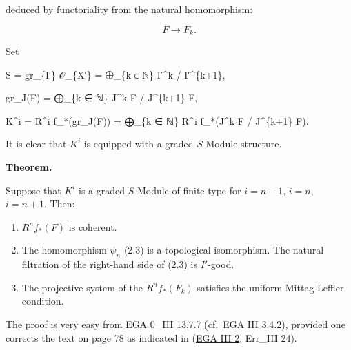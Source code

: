 \documentclass[
  11pt,
  a4paper,
]{book}
\newenvironment{Shaded}{}{}
\newcommand{\NormalTok}[1]{#1}
\begin{document}
deduced by functoriality from the natural homomorphism:

\[ F \to F_{k}. \]

Set

\begin{Shaded}
\begin{Highlighting}[]
\NormalTok{S = gr\_\{I′\} 𝒪\_\{X′\} = ⨁\_\{k ∈ ℕ\} I′\^{}k / I′\^{}\{k+1\},}
\end{Highlighting}
\end{Shaded}

\begin{Shaded}
\begin{Highlighting}[]
\NormalTok{gr\_J(F) = ⨁\_\{k ∈ ℕ\} J\^{}k F / J\^{}\{k+1\} F,}
\end{Highlighting}
\end{Shaded}

\begin{Shaded}
\begin{Highlighting}[]
\NormalTok{K\^{}i = R\^{}i f\_*(gr\_J(F)) = ⨁\_\{k ∈ ℕ\} R\^{}i f\_*(J\^{}k F / J\^{}\{k+1\} F).}
\end{Highlighting}
\end{Shaded}

It is clear that \(K^{i}\) is equipped with a graded \(S\)-Module
structure.

\textbf{Theorem.}

Suppose that \(K^{i}\) is a graded \(S\)-Module of finite type for
\(i = n - 1\), \(i = n\), \(i = n + 1\). Then:

\begin{enumerate}
\def\labelenumi{(\roman{enumi})}
\item
  \(R^{n} f_{*}(F)\) is coherent.
\item
  The homomorphism \(\psi_{n}\) (2.3) is a topological isomorphism. The
  natural filtration of the right-hand side of (2.3) is \(I'\)-good.
\item
  The projective system of the \(R^{n} f_{*}(F_{k})\) satisfies the
  uniform Mittag-Leffler condition.
\end{enumerate}

The proof is very easy from
\href{https://jcreinhold.github.io/ega/iii/06-ch0-13-projective-limits-homological-algebra.html\#137-derived-functors-of-a-projective-limit-of-arguments}{EGA
0\_III 13.7.7} (cf.~EGA III 3.4.2), provided one corrects the text on
page 78 as indicated in
(\href{https://jcreinhold.github.io/ega/iii/09-ch3-02-cohomology-projective-morphisms.html\#2-cohomological-study-of-projective-morphisms}{EGA
III 2}, Err\_III 24).
\end{document}
